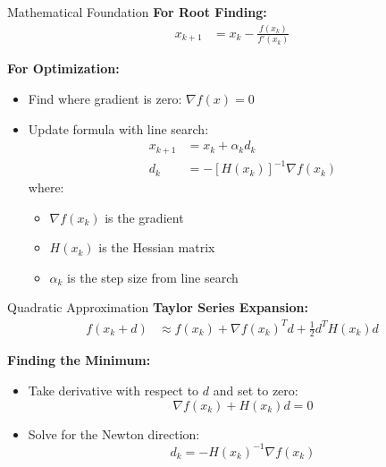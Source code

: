 \documentclass[10pt]{beamer}
\begin{document}
\begin{frame}[fragile]{Mathematical Foundation}
    \textbf{For Root Finding:}
    \begin{align*}
        x_{k+1} &= x_k - \frac{f(x_k)}{f'(x_k)}
    \end{align*}
    
    \textbf{For Optimization:}
    \begin{itemize}
        \item Find where gradient is zero: $\nabla f(x) = 0$
        \item Update formula with line search:
        \begin{align*}
            x_{k+1} &= x_k + \alpha_k d_k \\
            d_k &= -[H(x_k)]^{-1}\nabla f(x_k)
        \end{align*}
        where:
        \begin{itemize}
            \item $\nabla f(x_k)$ is the gradient
            \item $H(x_k)$ is the Hessian matrix
            \item $\alpha_k$ is the step size from line search
        \end{itemize}
    \end{itemize}
\end{frame}

\begin{frame}[fragile]{Quadratic Approximation}
    \textbf{Taylor Series Expansion:}
    \begin{align*}
        f(x_k + d) &\approx f(x_k) + \nabla f(x_k)^T d + \frac{1}{2}d^T H(x_k)d
    \end{align*}
    
    \textbf{Finding the Minimum:}
    \begin{itemize}
        \item Take derivative with respect to $d$ and set to zero:
        \[ \nabla f(x_k) + H(x_k)d = 0 \]
        \item Solve for the Newton direction:
        \[ d_k = -H(x_k)^{-1}\nabla f(x_k) \]
    \end{itemize}
\end{frame}
\end{document}
